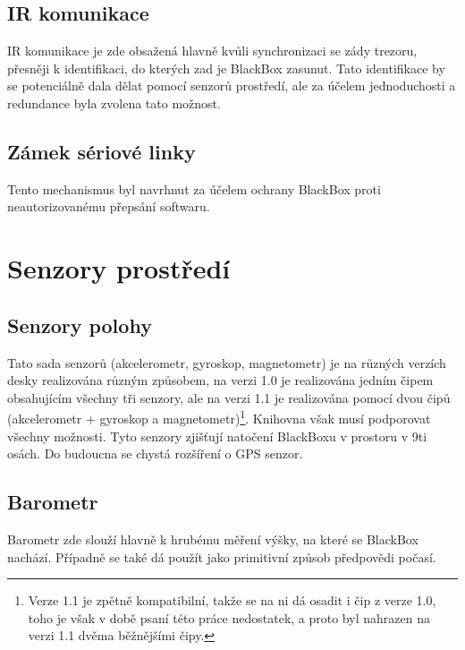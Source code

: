 \subsection{IR komunikace}
IR komunikace je zde obsažená hlavně kvůli synchronizaci se zády trezoru, přesněji k identifikaci, do kterých zad je BlackBox zasunut.
Tato identifikace by se potenciálně dala dělat pomocí senzorů prostředí, ale za účelem jednoduchosti a redundance byla zvolena tato možnost.

\subsection{Zámek sériové linky}
Tento mechanismus byl navrhnut za účelem ochrany BlackBox proti neautorizovanému přepsání softwaru.

\section{Senzory prostředí}

\subsection{Senzory polohy}
Tato sada senzorů (akcelerometr, gyroskop, magnetometr) je na různých verzích desky realizována různým způsobem, na verzi 1.0 je realizována jedním čipem obsahujícím všechny tři senzory, ale na verzi 1.1 je realizována pomocí dvou čipů (akcelerometr + gyroskop a magnetometr)\footnote{Verze 1.1 je zpětně kompatibilní, takže se na ni dá osadit i čip z verze 1.0, toho je však v době psaní této práce nedostatek, a proto byl nahrazen na verzi 1.1 dvěma běžnějšími čipy.}.
Knihovna však musí podporovat všechny možnosti.
Tyto senzory zjišťují natočení BlackBoxu v prostoru v 9ti osách.
Do budoucna se chystá rozšíření o GPS senzor. 

\subsection{Barometr}
Barometr zde slouží hlavně k hrubému měření výšky, na které se BlackBox nachází.
Případně se také dá použít jako primitivní způsob předpovědi počasí.